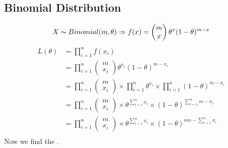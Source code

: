 \documentclass{report}
\begin{document}
        \subsection*{Binomial Distribution}
            \[X \thicksim Binomial(m, \theta) \Rightarrow f(x) =\begin{pmatrix}
                m \\ x 
            \end{pmatrix}\theta^x(1 - \theta)^{m-x}\]
            \[\begin{split}
                L(\theta) &= \prod_{i=1}^n f(x_i) \\
                &= \prod_{i=1}^n \begin{pmatrix}
                    m \\ x_i 
                \end{pmatrix}\theta^{x_i}(1 - \theta)^{m-x_i} \\
                &= \prod_{i=1}^n \begin{pmatrix}
                    m \\ x_i 
                \end{pmatrix} \times \prod_{i=1}^n\theta^{x_i} \times \prod_{i=1}^n(1 - \theta)^{m-x_i} \\
                &= \prod_{i=1}^n \begin{pmatrix}
                    m \\ x_i 
                \end{pmatrix} \times \theta^{\sum_{i=1}^nx_i} \times (1 - \theta)^{\sum_{i=1}^n m - x_i} \\
                &= \prod_{i=1}^n \begin{pmatrix}
                    m \\ x_i 
                \end{pmatrix} \times \theta^{\sum_{i=1}^nx_i} \times (1 - \theta)^{mn - \sum_{i=1}^n x_i} \\
            \end{split}\]
            Now we find the .
\end{document}

